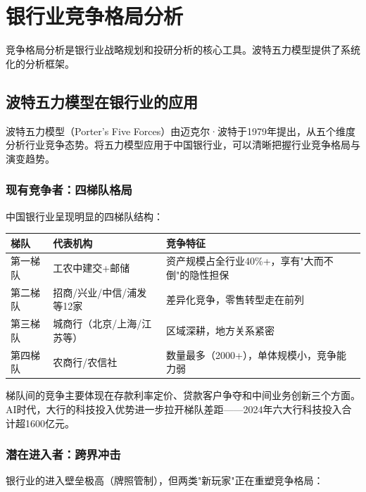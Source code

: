 \section{银行业竞争格局分析}

竞争格局分析是银行业战略规划和投研分析的核心工具。波特五力模型提供了系统化的分析框架。

\subsection{波特五力模型在银行业的应用}

波特五力模型（Porter's Five Forces）由迈克尔·波特于1979年提出，从五个维度分析行业竞争态势。将五力模型应用于中国银行业，可以清晰把握行业竞争格局与演变趋势。

\subsubsection{现有竞争者：四梯队格局}

中国银行业呈现明显的四梯队结构：

\begin{table}[H]
\centering
\begin{tabular}{llp{5cm}}
\toprule
\textbf{梯队} & \textbf{代表机构} & \textbf{竞争特征} \\
\midrule
第一梯队 & 工农中建交+邮储 & 资产规模占全行业40\%+，享有"大而不倒"的隐性担保 \\
第二梯队 & 招商/兴业/中信/浦发等12家 & 差异化竞争，零售转型走在前列 \\
第三梯队 & 城商行（北京/上海/江苏等） & 区域深耕，地方关系紧密 \\
第四梯队 & 农商行/农信社 & 数量最多（2000+），单体规模小，竞争能力弱 \\
\bottomrule
\end{tabular}
\end{table}

梯队间的竞争主要体现在存款利率定价、贷款客户争夺和中间业务创新三个方面。AI时代，大行的科技投入优势进一步拉开梯队差距——2024年六大行科技投入合计超1600亿元。

\subsubsection{潜在进入者：跨界冲击}

银行业的进入壁垒极高（牌照管制），但两类"新玩家"正在重塑竞争格局：


